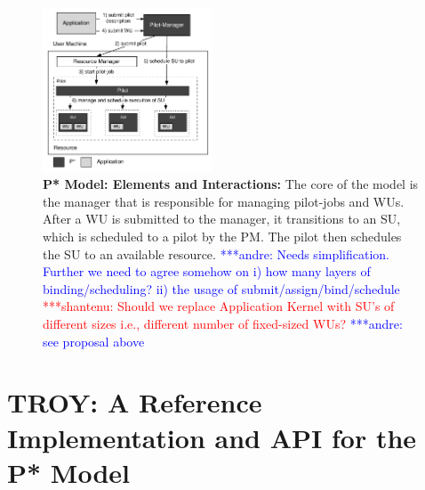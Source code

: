 \documentclass[conference,final]{IEEEtran}
\newcommand{\terminology}[1]{ {\textcolor{red} {(Terminology used: \textbf{#1}) }}}
\newcommand{\jhanote}[1]{ {\textcolor{red} { ***shantenu: #1 }}}
\newcommand{\alnote}[1]{ {\textcolor{blue} { ***andre: #1 }}}
\newcommand{\msnote}[1]{ {\textcolor{cyan} { ***mark: #1 }}}
\newcommand{\terminology}[1]{}
\newcommand{\alnote}[1]{}
\newcommand{\jhanote}[1]{}
\newcommand{\msnote}[1]{}
\newcommand{\up}{\vspace*{-1em}}
\newcommand{\upp}{\vspace*{-0.5em}}
\begin{document}
\begin{figure}[htbp]
    \centering\up
    \includegraphics[width=0.45\textwidth]{figures/pstar_model_single.pdf}
    \caption{ \textbf{P* Model: Elements and Interactions:} The core
      of the model is the manager that is responsible for managing
      pilot-jobs and WUs. After a WU is submitted to the manager, it
      transitions to an SU, which is scheduled to a pilot by the PM. The pilot 
	  then schedules the SU to an available resource. \alnote{Needs
        simplification. Further we need to agree somehow on i) how
        many layers of binding/scheduling? ii) the usage of
        submit/assign/bind/schedule} \jhanote{Should we replace
        Application Kernel with SU's of different sizes i.e.,
        different number of fixed-sized WUs?} \alnote{see proposal 
		above}\upp\upp}
    \label{fig:figures_pstar}
\end{figure}


\section{TROY: A Reference Implementation and API for the P*
  Model\upp\upp}




\end{document}
